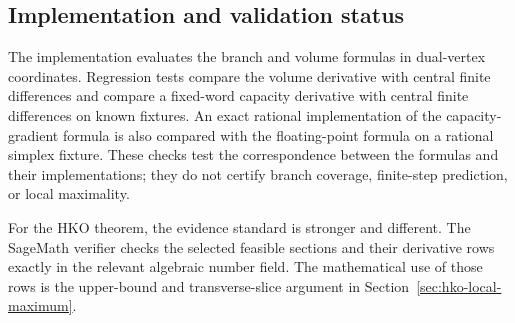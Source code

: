 \subsection{Implementation and validation status}
\label{subsec:first-order-validation}

The implementation evaluates the branch and volume formulas in dual-vertex
coordinates.  Regression tests compare the volume derivative with central
finite differences and compare a fixed-word capacity derivative with central
finite differences on known fixtures.  An exact rational implementation of
the capacity-gradient formula is also compared with the floating-point formula
on a rational simplex fixture.  These checks test the correspondence between
the formulas and their implementations; they do not certify branch coverage,
finite-step prediction, or local maximality.

For the HKO theorem, the evidence standard is stronger and different.  The
SageMath verifier checks the selected feasible sections and their derivative
rows exactly in the relevant algebraic number field.  The mathematical use of
those rows is the upper-bound and transverse-slice argument in
Section~\ref{sec:hko-local-maximum}.
